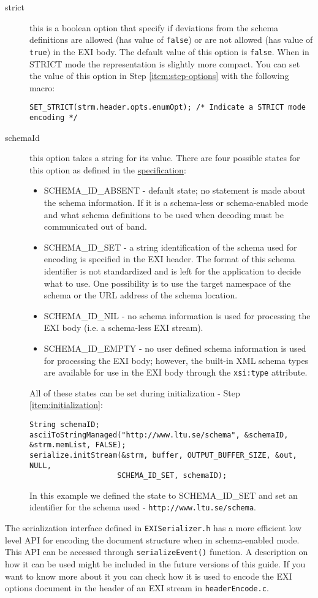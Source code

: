 \begin{description}
 \item[strict] this is a boolean option that specify if deviations from the schema
definitions are allowed (has value of \texttt{false}) or are not allowed (has value of \texttt{true})
in the EXI body. The default value of this option is \texttt{false}. When in STRICT mode
the representation is slightly more compact. You can set the
value of this option in Step \ref{item:step-options} with the following macro:
\begin{lstlisting}
SET_STRICT(strm.header.opts.enumOpt); /* Indicate a STRICT mode encoding */
\end{lstlisting}

 \item[schemaId] this option takes a string for its value. There are four possible states
for this option as defined in the \href{http://www.w3.org/TR/2011/REC-exi-20110310/#key-schemaIdOption}{specification}:
\begin{itemize}
 \item SCHEMA\_ID\_ABSENT - default state; no statement is made about the schema information.
If it is a schema-less or schema-enabled mode and what schema definitions to be used when decoding must be communicated out of band.
 \item SCHEMA\_ID\_SET - a string identification of the schema used for encoding is specified in the EXI header.
The format of this schema identifier is not standardized and is left for the application to decide what to use.
One possibility is to use the target namespace of the schema or the URL address of the schema location.
 \item SCHEMA\_ID\_NIL - no schema information is used for processing the EXI body (i.e. a schema-less EXI stream).
 \item SCHEMA\_ID\_EMPTY - no user defined schema information is used for processing the EXI body; however,
the built-in XML schema types are available for use in the EXI body
through the \texttt{xsi:type} attribute.
\end{itemize}
  All of these states can be set during initialization - Step \ref{item:initialization}:
\begin{lstlisting}
String schemaID;
asciiToStringManaged("http://www.ltu.se/schema", &schemaID, &strm.memList, FALSE);
serialize.initStream(&strm, buffer, OUTPUT_BUFFER_SIZE, &out, NULL, 
					SCHEMA_ID_SET, schemaID);                           
\end{lstlisting}
In this example we defined the state to SCHEMA\_ID\_SET and set an identifier for the schema used - \texttt{http://www.ltu.se/schema}.
 \end{description}

The serialization interface defined in \texttt{EXISerializer.h} has a more efficient low level API
for encoding the document structure when in schema-enabled mode. This API can be accessed through \texttt{serializeEvent()}
function. A description on how it can be used might be included in the future versions of this guide. If you want to know more about it
you can check how it is used to encode the EXI options document in the header of an EXI stream in \texttt{headerEncode.c}. 